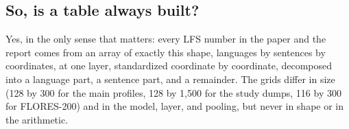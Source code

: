 \subsection{So, is a table always built?}

Yes, in the only sense that matters: every LFS number in the paper and the
report comes from an array of exactly this shape, languages by sentences by
coordinates, at one layer, standardized coordinate by coordinate, decomposed
into a language part, a sentence part, and a remainder. The grids differ in
size (128 by 300 for the main profiles, 128 by 1,500 for the study
dumps, 116 by 300 for FLORES-200) and in the model, layer, and pooling, but
never in shape or in the arithmetic.
